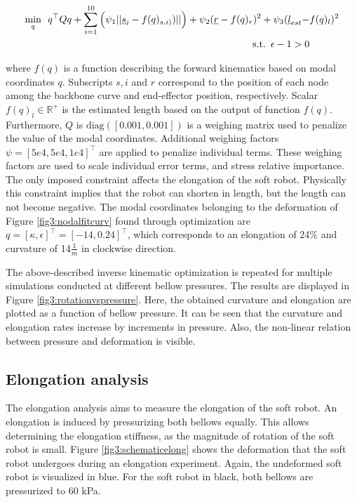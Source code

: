 \begin{equation}
\begin{aligned}
\min_{q} \hspace{5pt}  q^\top Q q  + \sum_{i=1}^{10}\Big(\psi_1 ||\text{\underbar{$s$}}_{i} - f(q)_{s,i)})|| \Big) +   \psi_2(\text{\underbar{$r$}}  - f(q)_{r})^2 +  \psi_3(\text{\underbar{$l$}}_{est} - & f(q)_l)^2  \\ 
\text{s.t.} \hspace{5pt} \epsilon - 1 > 0
\end{aligned}
\label{eq3:optim}
\end{equation}


where $f(q)$ is a function describing the forward kinematics based on modal coordinates $q$. Subscripts $s,i$ and $r$ correspond to the position of each node among the backbone curve and end-effector position, respectively. Scalar $f(q)_l \in \mathbb{R}^+$ is the estimated length based on the output of function $f(q)$. Furthermore, $Q$ is $\text{diag}([0.001,0.001])$ is a weighing matrix used to penalize the value of the modal coordinates. Additional weighing factors $\psi = [5e4,5e4,1e4]^\top$ are applied to penalize individual terms. These weighing factors are used to scale individual error terms, and stress relative importance. The only imposed constraint affects the elongation of the soft robot. Physically this constraint implies that the robot can shorten in length, but the length can not become negative. The modal coordinates belonging to the deformation of Figure \ref{fig3:nodalfitcurv} found through optimization are $q = [\kappa,\epsilon]^\top = [-14,0.24]^\top$, which corresponds to an elongation of 24\% and curvature of 14$\frac{1}{m}$ in clockwise direction.


The above-described inverse kinematic optimization is repeated for multiple simulations conducted at different bellow pressures. The results are displayed in Figure \ref{fig3:rotationvspressure}. Here, the obtained curvature and elongation are plotted as a function of bellow pressure. It can be seen that the curvature and elongation rates increase by increments in pressure. Also, the non-linear relation between pressure and deformation is visible.




\subsection{Elongation analysis}
\label{subsecelong}

The elongation analysis aims to measure the elongation of the soft robot. An elongation is induced by pressurizing both bellows equally. This allows determining the elongation stiffness, as the magnitude of rotation of the soft robot is small. Figure \ref{fig3:schematicelong} shows the deformation that the soft robot undergoes during an elongation experiment. Again, the undeformed soft robot is visualized in blue. For the soft robot in black, both bellows are pressurized to 60 kPa. 

